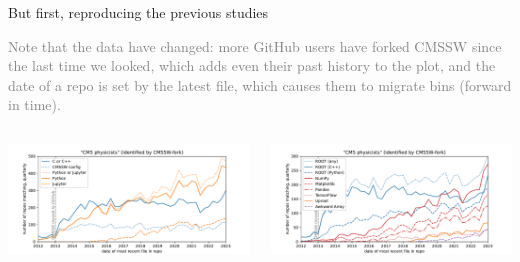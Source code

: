 \documentclass[aspectratio=169]{beamer}
\begin{document}
\begin{frame}{But first, reproducing the previous studies}
\vspace{0.5 cm}

\textcolor{gray}{Note that the data have changed: more GitHub users have forked CMSSW since the last time we looked, which adds even their past history to the plot, and the date of a repo is set by the latest file, which causes them to migrate bins (forward in time).}

\begin{columns}
\hspace{-0.4 cm}\includegraphics[width=1.05\linewidth]{analysis/github-language-cmsswseed.pdf}

\hspace{-0.45 cm}\includegraphics[width=1.05\linewidth]{analysis/github-package-cmsswseed.pdf}
\end{columns}

\begin{columns}

\small
{}


\small
{}

\end{columns}
\end{frame}
\end{document}
